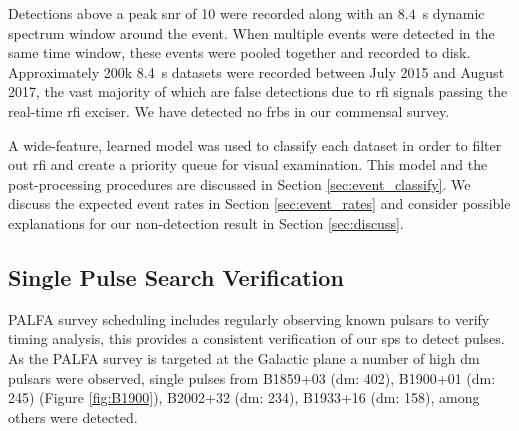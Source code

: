 \documentclass[a4paper,fleqn,usenatbib]{mnras}
\begin{document}
Detections above a peak \gls{snr} of 10 were recorded along with an
$8.4$~s dynamic spectrum window around the event. When multiple events
were detected in the same time window, these events were pooled
together and recorded to disk.  Approximately 200k 8.4~s datasets were
recorded between July 2015 and August 2017, the vast majority of which
are false detections due to \gls{rfi} signals passing the real-time
\gls{rfi} exciser. We have detected no \glspl{frb} in our commensal
survey.

A wide-feature, learned model was used to classify each dataset in
order to filter out \gls{rfi} and create a priority queue for visual
examination. This model and the post-processing procedures are
discussed in Section \ref{sec:event_classify}. We discuss the expected
event rates in Section \ref{sec:event_rates} and consider possible
explanations for our non-detection result in Section
\ref{sec:discuss}.


\subsection{Single Pulse Search Verification}
\label{sec:system_verify}

PALFA survey scheduling includes regularly observing known pulsars to
verify timing analysis, this provides a consistent verification of our
\gls{sps} to detect pulses. As the PALFA survey is targeted at the
Galactic plane a number of high \gls{dm} pulsars were observed, single
pulses from B1859+03 (\gls{dm}: 402), B1900+01 (\gls{dm}: 245) (Figure
\ref{fig:B1900}), B2002+32 (\gls{dm}: 234), B1933+16 (\gls{dm}: 158),
among others were detected.
\end{document}
